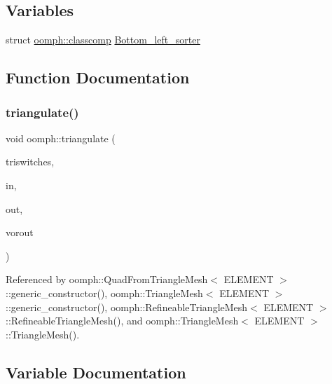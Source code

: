 \subsection*{Variables}
\begin{DoxyCompactItemize}
\item 
struct \hyperlink{structoomph_1_1classcomp}{oomph\+::classcomp} \hyperlink{namespaceoomph_a14c756ede5a394b4c6cbf49448813b7e}{Bottom\+\_\+left\+\_\+sorter}
\end{DoxyCompactItemize}


\subsection{Function Documentation}
\mbox{\label{namespaceoomph_a3af531b221ad8fe56e4f9e3364435b87}} 
\subsubsection{\texorpdfstring{triangulate()}{triangulate()}}
{\footnotesize\ttfamily void oomph\+::triangulate (\begin{DoxyParamCaption}\item[{char $\ast$}]{triswitches,  }\item[{struct oomph\+::\+Triangulate\+IO $\ast$}]{in,  }\item[{struct oomph\+::\+Triangulate\+IO $\ast$}]{out,  }\item[{struct oomph\+::\+Triangulate\+IO $\ast$}]{vorout }\end{DoxyParamCaption})}



Referenced by oomph\+::\+Quad\+From\+Triangle\+Mesh$<$ E\+L\+E\+M\+E\+N\+T $>$\+::generic\+\_\+constructor(), oomph\+::\+Triangle\+Mesh$<$ E\+L\+E\+M\+E\+N\+T $>$\+::generic\+\_\+constructor(), oomph\+::\+Refineable\+Triangle\+Mesh$<$ E\+L\+E\+M\+E\+N\+T $>$\+::\+Refineable\+Triangle\+Mesh(), and oomph\+::\+Triangle\+Mesh$<$ E\+L\+E\+M\+E\+N\+T $>$\+::\+Triangle\+Mesh().



\subsection{Variable Documentation}
\mbox{\label{namespaceoomph_a14c756ede5a394b4c6cbf49448813b7e}} 
